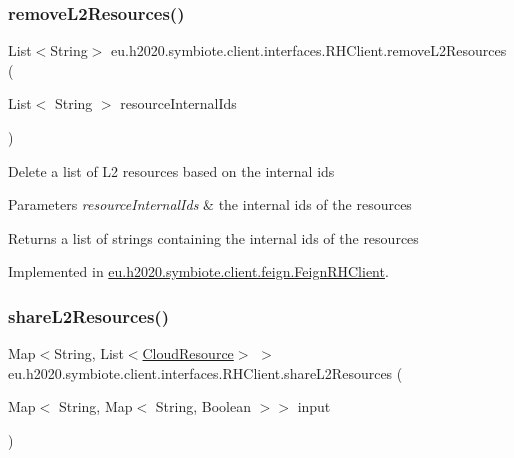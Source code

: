 \subsubsection{\texorpdfstring{remove\+L2\+Resources()}{removeL2Resources()}}
{\footnotesize\ttfamily List$<$String$>$ eu.\+h2020.\+symbiote.\+client.\+interfaces.\+R\+H\+Client.\+remove\+L2\+Resources (\begin{DoxyParamCaption}\item[{List$<$ String $>$}]{resource\+Internal\+Ids }\end{DoxyParamCaption})}

Delete a list of L2 resources based on the internal ids


\begin{DoxyParams}{Parameters}
{\em resource\+Internal\+Ids} & the internal ids of the resources \\
\hline
\end{DoxyParams}
\begin{DoxyReturn}{Returns}
a list of strings containing the internal ids of the resources 
\end{DoxyReturn}


Implemented in \hyperlink{classeu_1_1h2020_1_1symbiote_1_1client_1_1feign_1_1FeignRHClient_a2a7432c5df835ea79f3b5f1f4aec99bf}{eu.\+h2020.\+symbiote.\+client.\+feign.\+Feign\+R\+H\+Client}.

\mbox{\label{interfaceeu_1_1h2020_1_1symbiote_1_1client_1_1interfaces_1_1RHClient_ab033d6b4967030ca4d63f8186b147a88}} 
\subsubsection{\texorpdfstring{share\+L2\+Resources()}{shareL2Resources()}}
{\footnotesize\ttfamily Map$<$String, List$<$\hyperlink{classeu_1_1h2020_1_1symbiote_1_1cloud_1_1model_1_1internal_1_1CloudResource}{Cloud\+Resource}$>$ $>$ eu.\+h2020.\+symbiote.\+client.\+interfaces.\+R\+H\+Client.\+share\+L2\+Resources (\begin{DoxyParamCaption}\item[{Map$<$ String, Map$<$ String, Boolean $>$$>$}]{input }\end{DoxyParamCaption})}

